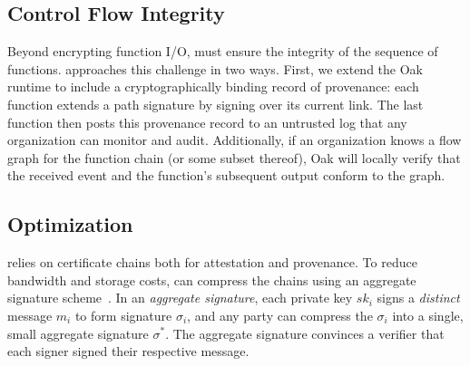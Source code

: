 \subsection{Control Flow Integrity}
%
Beyond encrypting function I/O, \SystemName must ensure the integrity
of the sequence of functions.
%
%
\SystemName approaches this challenge in two ways.
%
First, we extend the Oak runtime to include a cryptographically binding record
of provenance: each function extends a path signature by signing over its
current link.
%
The last function then posts this provenance record to an untrusted log that
any organization can monitor and audit.
%
Additionally, if an organization knows a flow graph for the function chain (or
some subset thereof),  Oak will locally verify that the received event and the
function's subsequent output conform to the graph.


\subsection{Optimization}
%
\SystemName relies on certificate chains both for attestation and provenance.
%
To reduce bandwidth and storage costs, \SystemName can compress the chains
using an aggregate signature
scheme~\cite{03-eurocrypt-aggregate_signatures_bilinear_maps}.
%
In an \emph{aggregate signature},
each private key $sk_i$ signs a \emph{distinct} message $m_i$ to form signature
$\sigma_i$, and any party can compress the $\sigma_i$ into a single,
small aggregate signature $\sigma^*$.  
%
The aggregate signature convinces a verifier that each signer signed their
respective message.


